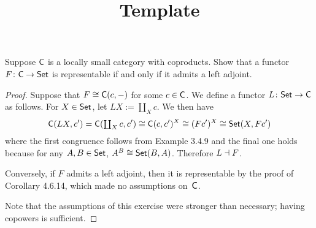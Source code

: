 \documentclass[../../solutions]{subfiles}
\title{Template}
\author{}
\begin{document}
\maketitle

%   

\begin{exercise}
  Suppose ${\mathsf{C}}$ is a locally small category with coproducts.  Show
  that a functor ${F}\colon{{\mathsf{C}}}\to{\ensuremath{\mathsf{Set}}}$ is representable if and only if
  it admits a left adjoint.
\end{exercise}

\begin{proof}
  Suppose that $F\cong {\mathsf{C}}(c,-)$ for some $c\in{\mathsf{C}}$.  We define a
  functor ${L}\colon{\ensuremath{\mathsf{Set}}}\to{{\mathsf{C}}}$ as follows.  For $X\in\mathsf{Set}$, let $LX:=
  \coprod_X c$.  We then have
  $${\mathsf{C}}(LX,c') = {\mathsf{C}}({\textstyle\coprod_X c},c')
  \cong {\mathsf{C}}(c,c')^X \cong (Fc')^X \cong \mathsf{Set}(X,Fc')$$
  where the first congruence follows from Example 3.4.9 and the final
  one holds because for any $A,B\in\mathsf{Set}$, $A^B\cong\mathsf{Set}(B,A)$.
  Therefore $L\dashv F$.

  Conversely, if $F$ admits a left adjoint, then it is representable
  by the proof of Corollary 4.6.14, which made no assumptions
  on~${\mathsf{C}}$.

  Note that the assumptions of this exercise were stronger than
  necessary; having copowers is sufficient.
\end{proof}
\end{document}
